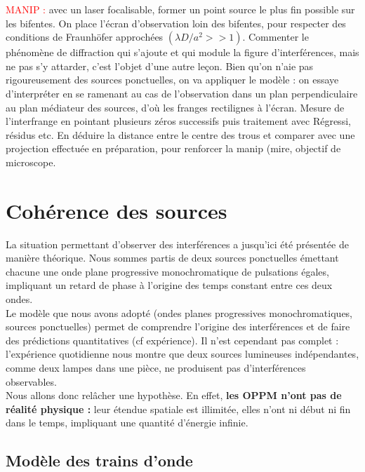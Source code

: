 \documentclass[11pt,a4paper]{report}
\begin{document}
\textcolor{red}{MANIP :} avec un laser focalisable, former un point source le plus fin possible sur les bifentes. On place l'écran d'observation loin des bifentes, pour respecter des conditions de Fraunhöfer approchées $(\lambda D/a^2 >> 1)$. Commenter le phénomène de diffraction qui s'ajoute et qui module la figure d'interférences, mais ne pas s'y attarder, c'est l'objet d'une autre leçon. Bien qu'on n'aie pas rigoureusement des sources ponctuelles, on va appliquer le modèle : on essaye d'interpréter en se ramenant au cas de l'observation dans un plan perpendiculaire au plan médiateur des sources, d'où les franges rectilignes à l'écran. Mesure de l'interfrange en pointant plusieurs zéros successifs puis traitement avec Régressi, résidus etc. En déduire la distance entre le centre des trous et comparer avec une projection effectuée en préparation, pour renforcer la manip (mire, objectif de microscope.\\

\newpage
\section{Cohérence des sources}

La situation permettant d'observer des interférences a jusqu'ici été présentée de manière théorique. Nous sommes partis de deux sources ponctuelles émettant chacune une onde plane progressive monochromatique de pulsations égales, impliquant un retard de phase à l'origine des temps constant entre ces deux ondes.\\ 

Le modèle que nous avons adopté (ondes planes progressives monochromatiques, sources ponctuelles) permet de comprendre l'origine des interférences et de faire des prédictions quantitatives (cf expérience). Il n'est cependant pas complet : l'expérience quotidienne nous montre que deux sources lumineuses indépendantes, comme deux lampes dans une pièce, ne produisent pas d'interférences observables.\\ 

Nous allons donc relâcher une hypothèse. En effet, \textbf{les OPPM n'ont pas de réalité physique :} leur étendue spatiale est illimitée, elles n'ont ni début ni fin dans le temps, impliquant une quantité d'énergie infinie.

\subsection{Modèle des trains d'onde}
\end{document}
